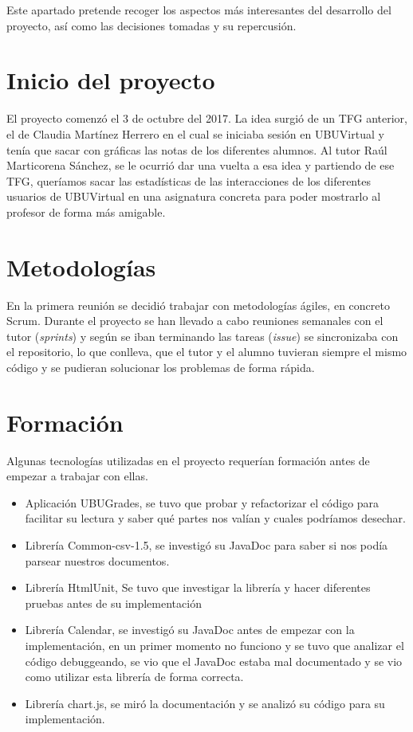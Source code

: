
Este apartado pretende recoger los aspectos más interesantes del desarrollo del proyecto, así como las decisiones tomadas y su repercusión.

\section{Inicio del proyecto}\label{inicio-del-proyecto}

El proyecto comenzó el 3 de octubre del 2017. La idea surgió de un TFG anterior, el de Claudia Martínez Herrero \cite{claudia} en el cual se iniciaba sesión en UBUVirtual y tenía que sacar con gráficas las notas de los diferentes alumnos. Al tutor Raúl Marticorena Sánchez, se le ocurrió dar una vuelta a esa idea y partiendo de ese TFG, queríamos sacar las estadísticas de las interacciones de los diferentes usuarios de UBUVirtual en una asignatura concreta para poder mostrarlo al profesor de forma más amigable.


\section{Metodologías}\label{metodologias-proyecto}

En la primera reunión se decidió trabajar con metodologías ágiles, en concreto Scrum. Durante el proyecto se han llevado a cabo reuniones semanales con el tutor (\emph{sprints}) y según se iban terminando las tareas (\emph{issue}) se sincronizaba con el repositorio, lo que conlleva, que el tutor y el alumno tuvieran siempre el mismo código y se pudieran solucionar los problemas de forma rápida.

\section{Formación}\label{formacion}

Algunas tecnologías utilizadas en el proyecto requerían formación antes de empezar a trabajar con ellas.

\begin{itemize}
	\tightlist
	\item
	Aplicación UBUGrades, se tuvo que probar y refactorizar el código para facilitar su lectura y saber qué partes nos valían y cuales podríamos desechar.
	\item
	Librería Common-csv-1.5, se investigó su JavaDoc para saber si nos podía parsear nuestros documentos.
	\item
	Librería HtmlUnit, Se tuvo que investigar la librería y hacer diferentes pruebas antes de su implementación
	\item
	Librería Calendar, se investigó su JavaDoc antes de empezar con la implementación, en un primer momento no funciono y se tuvo que analizar el código debuggeando, se vio que el JavaDoc estaba mal documentado y se vio como utilizar esta librería de forma correcta.
	\item
	Librería chart.js, se miró la documentación \cite{javascript:chart} y se analizó su código para su implementación.
\end{itemize}

